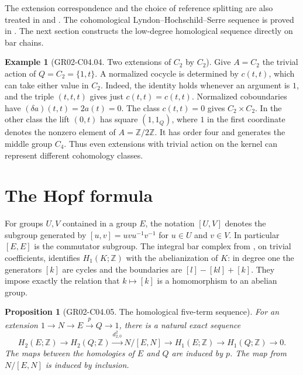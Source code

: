 \documentclass[11pt,oneside,openany]{book}
\newtheorem{proposition}[theorem]{Proposition}
\theoremstyle{definition}
\newtheorem{example}[theorem]{Example}
\theoremstyle{remark}
\begin{document}
The extension correspondence and the choice of reference
splitting are also treated in \cite{conrad-extensions} and
\cite[Theorems 23.3 and 24.3]{lassueur}. The cohomological
Lyndon--Hochschild--Serre sequence is proved in
\cite[A05]{homalg}. The next section constructs the low-degree
homological sequence directly on bar chains.

\begin{example}[GR02-C04.04. Two extensions of \(C_2\) by \(C_2\)]
\label{ex:gr02-c2-extensions}
Give \(A=C_2\) the trivial action of \(Q=C_2=\{1,t\}\).
A normalized cocycle is determined by \(c(t,t)\), which can
take either value in \(C_2\). Indeed, the identity holds whenever
an argument is \(1\), and the triple \((t,t,t)\) gives just
\(c(t,t)=c(t,t)\). Normalized coboundaries have
\((\delta a)(t,t)=2a(t)=0\). The class \(c(t,t)=0\) gives
\(C_2\times C_2\). In the other class the lift \((0,t)\) has
square \((1,1_Q)\), where \(1\) in the first coordinate denotes
the nonzero element of \(A=\mathbb Z/2\mathbb Z\).
It has order four and generates the middle group \(C_4\).
Thus even extensions with trivial action on the kernel can
represent different cohomology classes.
\end{example}

\section{The Hopf formula}

For groups \(U,V\) contained in a group \(E\), the notation
\([U,V]\) denotes the subgroup generated by
\([u,v]=uvu^{-1}v^{-1}\) for \(u\in U\) and \(v\in V\).
In particular \([E,E]\) is the commutator subgroup. The integral
bar complex from \cite[A10]{homalg}, on trivial coefficients,
identifies \(H_1(K;\mathbb Z)\) with the abelianization of \(K\):
in degree one the generators \([k]\) are cycles and the
boundaries are \([l]-[kl]+[k]\). They impose exactly the relation
that \(k\mapsto[k]\) is a homomorphism to an abelian group.

\begin{proposition}[GR02-C04.05. The homological five-term sequence]
\label{prop:gr02-homological-five-term}
For an extension \(1\to N\to E\xrightarrow{p}Q\to 1\), there is
a natural exact sequence
\[
 H_2(E;\mathbb Z)\longrightarrow H_2(Q;\mathbb Z)
 \xrightarrow{d^2_{2,0}}N/[E,N]\longrightarrow
 H_1(E;\mathbb Z)\longrightarrow H_1(Q;\mathbb Z)\longrightarrow 0.
\]
The maps between the homologies of \(E\) and \(Q\) are induced by
\(p\). The map from \(N/[E,N]\) is induced by inclusion.
\end{proposition}
\end{document}
